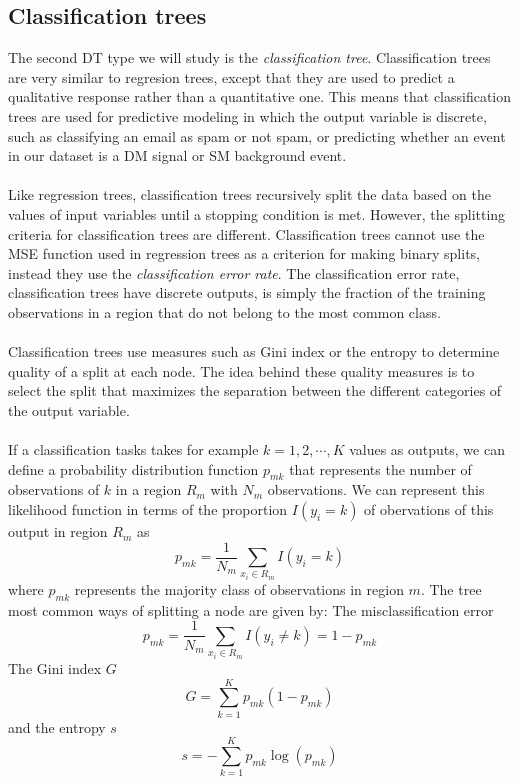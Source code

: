 \documentclass[12pt, a4paper]{book}
\begin{document}
\subsection{Classification trees}
The second DT type we will study is the \textit{classification tree}. Classification trees are very similar to regresion trees, except that they are used to predict a qualitative response rather than a quantitative one. This means that classification trees are used for predictive modeling in 
which the output variable is discrete, such as classifying an email as spam or not spam, or predicting whether an event in our dataset is a DM signal or SM background event.\\
\\Like regression trees, classification trees recursively split the data based on the values of input variables until a stopping condition is met. However, the splitting criteria for classification trees are different. Classification trees cannot use the MSE function used in regression trees 
as a criterion for making binary splits, instead they use the \textit{classification error rate}. The classification error rate, classification trees have discrete outputs, is simply the fraction of the training observations in a region that do not belong to the most common class.\\
\\Classification trees use measures such as Gini index or the entropy to determine quality of a split at each node. The idea behind these quality measures is to select the split that maximizes the separation between the different categories of the output variable.\\
\\If a classification tasks takes for example $k=1,2,\cdots,K$ values as outputs, we can define a probability distribution function $p_{mk}$ that represents the number of observations of $k$ in a region $R_m$ with $N_m$ observations. We can represent this likelihood function in terms 
of the proportion $I(y_i=k)$ of obervations of this output in region $R_m$ as
$$
p_{mk}=\frac{1}{N_m}\sum_{x_i\in R_m}I(y_i=k)
$$
where $p_{mk}$ represents the majority class of observations in region $m$. The tree most common ways of splitting a node are given by: The misclassification error
$$
p_{mk}=\frac{1}{N_m}\sum_{x_i\in R_m}I(y_i\ne k) = 1-p_{mk}
$$
The Gini index $G$
\begin{equation}\label{eq:gini}
    G=\sum_{k=1}^K p_{mk}(1-p_{mk})
\end{equation}
and the entropy $s$
$$
s=-\sum_{k=1}^K p_{mk}\log(p_{mk})
$$
\end{document}
